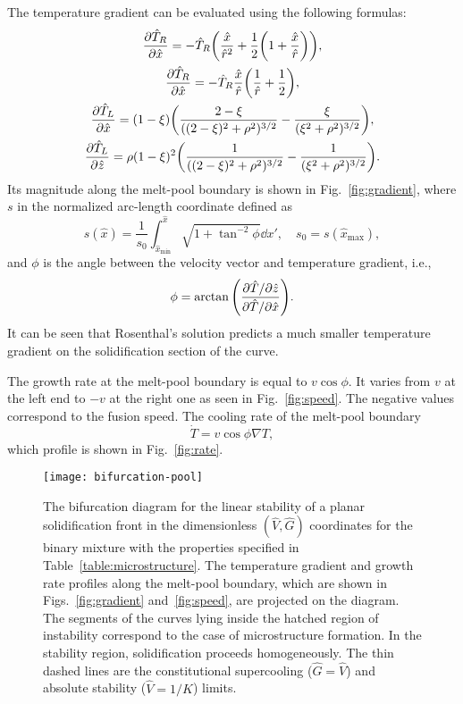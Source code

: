 \documentclass{article}
\begin{document}
The temperature gradient can be evaluated using the following formulas:
\begin{gather}
    \pdv{\hat{T}_R}{\hat{x}} =
        -\hat{T}_R\qty( \frac{\hat{x}}{\hat{r}^2} + \frac12\qty(1 + \frac{\hat{x}}{\hat{r}}) ), \label{eq:dTRdx}\\
    \pdv{\hat{T}_R}{\hat{x}} =
        -\hat{T}_R\frac{\hat{x}}{\hat{r}}\qty( \frac1{\hat{r}} + \frac12 ), \label{eq:dTRdz}\\
    \pdv{\hat{T}_L}{\hat{x}} =
        (1-\xi)\qty( \frac{2-\xi}{((2-\xi)^2 + \rho^2)^{3/2}} - \frac{\xi}{(\xi^2 + \rho^2)^{3/2}} ), \label{eq:dTLdx}\\
    \pdv{\hat{T}_L}{\hat{z}} =
        \rho(1-\xi)^2\qty( \frac1{((2-\xi)^2 + \rho^2)^{3/2}} - \frac1{(\xi^2 + \rho^2)^{3/2}} ). \label{eq:dTLdz}
\end{gather}
Its magnitude along the melt-pool boundary is shown in Fig.~\ref{fig:gradient},
where $s$ in the normalized arc-length coordinate defined as
\begin{equation}\label{eq:s}
    s(\hat{x}) = \frac1{s_0}\int_{\hat{x}_\text{min}}^{\hat{x}}\sqrt{1+\tan^{-2}\phi}\dd{x}',
        \quad s_0 = s(\hat{x}_\text{max}),
\end{equation}
and $\phi$ is the angle between the velocity vector and temperature gradient, i.e.,
\begin{equation}\label{eq:phi}
    \phi = \arctan\qty(\frac{\partial\hat{T}/\partial\hat{z}}{\partial\hat{T}/\partial\hat{x}}).
\end{equation}
It can be seen that Rosenthal's solution predicts a much smaller temperature gradient
on the solidification section of the curve.

The growth rate at the melt-pool boundary is equal to $v\cos\phi$.
It varies from $v$ at the left end to $-v$ at the right one as seen in Fig.~\ref{fig:speed}.
The negative values correspond to the fusion speed.
The cooling rate of the melt-pool boundary
\begin{equation}\label{eq:dotT}
    \dot{T} = v\cos\phi\nabla T,
\end{equation}
which profile is shown in Fig.~\ref{fig:rate}.

\begin{figure}
    \centering
    \texttt{[image: bifurcation-pool]}
    \caption{
        The bifurcation diagram for the linear stability of a planar solidification front
        in the dimensionless $(\hat{V},\hat{G})$ coordinates for the binary mixture
        with the properties specified in Table~\ref{table:microstructure}.
        The temperature gradient and growth rate profiles along the melt-pool boundary,
        which are shown in Figs.~\ref{fig:gradient} and~\ref{fig:speed}, are projected on the diagram.
        The segments of the curves lying inside the hatched region of instability correspond to the case
        of microstructure formation. In the stability region, solidification proceeds homogeneously.
        The thin dashed lines are the constitutional supercooling ($\hat{G} = \hat{V}$)
        and absolute stability ($\hat{V} = 1/K$) limits.
    }\label{fig:bifurcation-pool}
\end{figure}
\end{document}
